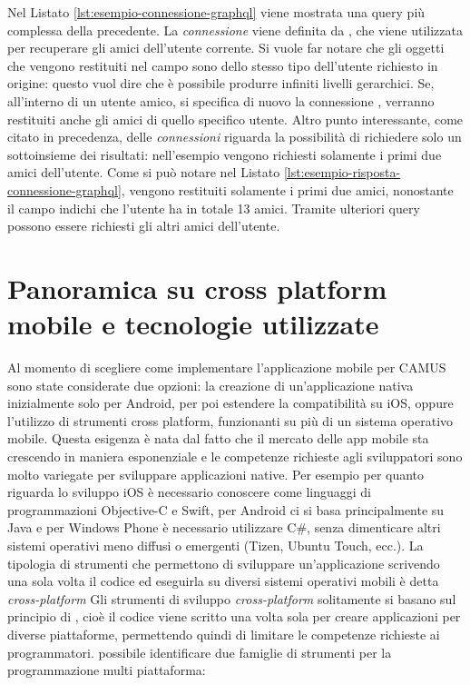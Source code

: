 Nel Listato \ref{lst:esempio-connessione-graphql} viene mostrata una query più complessa della precedente. La \emph{connessione} viene definita da , che viene utilizzata per recuperare gli amici dell'utente corrente. Si vuole far notare che gli oggetti che vengono restituiti nel campo  sono dello stesso tipo dell'utente richiesto in origine: questo vuol dire che è possibile produrre infiniti livelli gerarchici. Se, all'interno di un utente amico, si specifica di nuovo la connessione , verranno restituiti anche gli amici di quello specifico utente. Altro punto interessante, come citato in precedenza, delle \emph{connessioni} riguarda la possibilità di richiedere solo un sottoinsieme dei risultati: nell'esempio vengono richiesti solamente i primi due amici dell'utente. Come si può notare nel Listato \ref{lst:esempio-risposta-connessione-graphql}, vengono restituiti solamente i primi due amici, nonostante il campo  indichi che l'utente ha in totale 13 amici. Tramite ulteriori query possono essere richiesti gli altri amici dell'utente.

\section{Panoramica su cross platform mobile e tecnologie utilizzate}\label{sec:panoramica-cross-platform-mobile}

Al momento di scegliere come implementare l'applicazione mobile per CAMUS sono state considerate due opzioni: la creazione di un'applicazione nativa inizialmente solo per Android, per poi estendere la compatibilità su iOS, oppure l'utilizzo di strumenti cross platform, funzionanti su più di un sistema operativo mobile.
Questa esigenza è nata dal fatto che il mercato delle app mobile sta crescendo in maniera esponenziale e le competenze richieste agli sviluppatori sono molto variegate per sviluppare applicazioni native.
Per esempio per quanto riguarda lo sviluppo iOS è necessario conoscere come linguaggi di programmazioni Objective-C e Swift, per Android ci si basa principalmente su Java e per Windows Phone è necessario utilizzare C\#, senza dimenticare altri sistemi operativi meno diffusi o emergenti (Tizen, Ubuntu Touch, ecc.). La tipologia di strumenti che permettono di sviluppare un'applicazione scrivendo una sola volta il codice ed eseguirla su diversi sistemi operativi mobili è detta \emph{cross-platform}
Gli strumenti di sviluppo \emph{cross-platform} solitamente si basano sul principio di , cioè il codice viene scritto una volta sola per creare applicazioni per diverse piattaforme, permettendo quindi di limitare le competenze richieste ai programmatori. 
\upe possibile identificare due famiglie di strumenti per la programmazione multi piattaforma:

